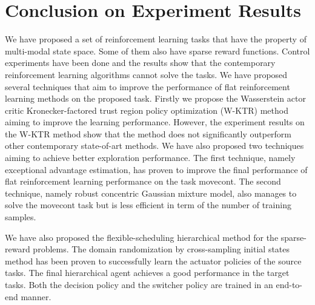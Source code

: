 \section{Conclusion on Experiment Results}
We have proposed a set of reinforcement learning tasks that have the property of multi-modal state space. Some of them also have sparse reward functions. Control experiments have been done and the results show that the contemporary reinforcement learning algorithms cannot solve the tasks.
We have proposed several techniques that aim to improve the performance of flat reinforcement learning methods on the proposed task. Firstly we propose the Wasserstein actor critic Kronecker-factored trust region policy optimization (W-KTR) method aiming to improve the learning performance. However, the experiment results on the W-KTR method show that the method does not significantly outperform other contemporary state-of-art methods. We have also proposed two techniques aiming to achieve better exploration performance. The first technique, namely exceptional advantage estimation, has proven to improve the final performance of flat reinforcement learning performance on the task movecont. The second technique, namely robust concentric Gaussian mixture model, also manages to solve the movecont task but is less efficient in term of the number of training samples. 


We have also proposed the flexible-scheduling hierarchical method for the sparse-reward problems. The domain randomization by cross-sampling initial states method has been proven to successfully learn the actuator policies of the source tasks. The final hierarchical agent achieves a good performance in the target tasks. Both the decision policy and the switcher policy are trained in an end-to-end manner. 